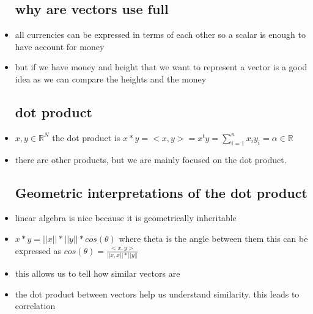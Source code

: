 \documentclass{article}
\begin{document}
\begin{itemize}
\subsection{why are vectors use full}
\item all currencies can be expressed in terms of each other so a scalar is enough to have account for money 
\item but if we have money and height that we want to represent a vector is a good idea as we can compare the heights and the money
\subsection{dot product}
\item $x,y\in \mathbb{R}^N$ the dot product is $x*y=<x,y>=x^ty=\sum_{i=1}^{n}x_iy_i=\alpha\in\mathbb{R}$ 
\item there are other products, but we are mainly focused on the dot product.
\subsection{Geometric interpretations of the dot product}
\item linear algebra is nice because it is geometrically inheritable 
\item $x*y=||x||*||y||*cos(\theta)$ where theta is the angle between them this can be expressed as $cos(\theta)=\frac{<x,y>}{||x,x||*||y||}$
\item this allows us to tell how similar vectors are 
\item the dot product between vectors help us understand similarity. this leads to correlation

\end{itemize}
\end{document}
